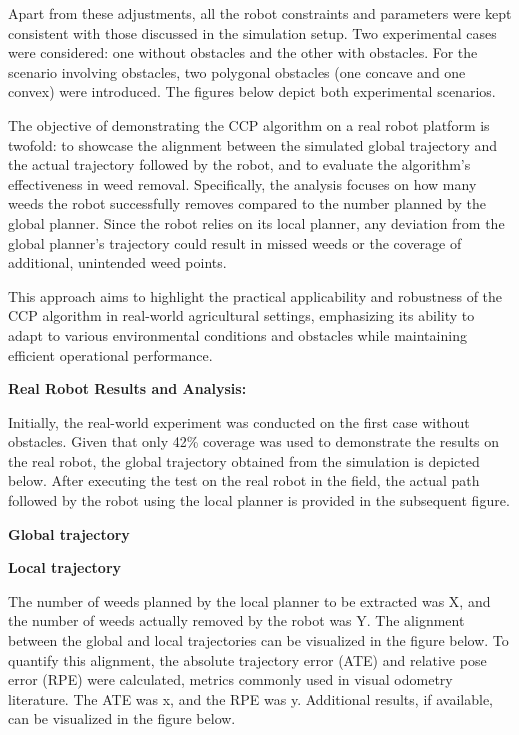 Apart from these adjustments, all the robot constraints and parameters were kept consistent with those discussed in the simulation setup. Two experimental cases were considered: one without obstacles and the other with obstacles. For the scenario involving obstacles, two polygonal obstacles (one concave and one convex) were introduced. The figures below depict both experimental scenarios. 


\vspace*{6mm}   


The objective of demonstrating the CCP algorithm on a real robot platform is twofold: to showcase the alignment between the simulated global trajectory and the actual trajectory followed by the robot, and to evaluate the algorithm's effectiveness in weed removal. Specifically, the analysis focuses on how many weeds the robot successfully removes compared to the number planned by the global planner. Since the robot relies on its local planner, any deviation from the global planner's trajectory could result in missed weeds or the coverage of additional, unintended weed points.

\vspace*{6mm}   


This approach aims to highlight the practical applicability and robustness of the CCP algorithm in real-world agricultural settings, emphasizing its ability to adapt to various environmental conditions and obstacles while maintaining efficient operational performance.

\vspace*{6mm}   


\textbf{Real Robot Results and Analysis:}    

Initially, the real-world experiment was conducted on the first case without obstacles. Given that only 42\% coverage was used to demonstrate the results on the real robot, the global trajectory obtained from the simulation is depicted below. After executing the test on the real robot in the field, the actual path followed by the robot using the local planner is provided in the subsequent figure.

\textbf{Global trajectory}

\textbf{Local trajectory}


\vspace*{6mm}   


The number of weeds planned by the local planner to be extracted was X, and the number of weeds actually removed by the robot was Y. The alignment between the global and local trajectories can be visualized in the figure below. To quantify this alignment, the absolute trajectory error (ATE) and relative pose error (RPE) were calculated, metrics commonly used in visual odometry literature. The ATE was x, and the RPE was y. Additional results, if available, can be visualized in the figure below.

